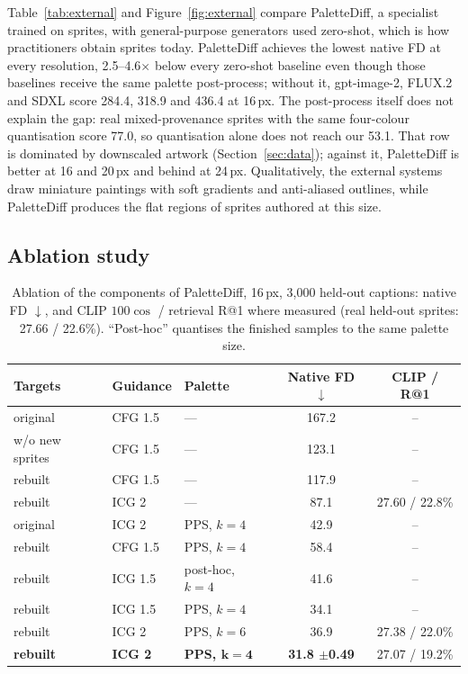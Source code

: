 \documentclass{article} %
\newcommand{\pmsd}[1]{{\scriptsize$\pm$#1}}
\newcommand{\ours}{PaletteDiff}
\begin{document}
Table~\ref{tab:external} and Figure~\ref{fig:external} compare \ours{}, a specialist trained on sprites, with
general-purpose generators used zero-shot, which is how practitioners obtain sprites today. \ours{} achieves the
lowest native FD at every resolution, 2.5--4.6$\times$ below every zero-shot baseline even
though those baselines receive the same palette post-process; without it, gpt-image-2, FLUX.2 and SDXL score 284.4, 318.9
and 436.4 at 16\,px. The post-process itself does not explain the gap: real mixed-provenance sprites with the same
four-colour quantisation score 77.0, so quantisation alone does not reach our 53.1. That row is dominated by
downscaled artwork (Section~\ref{sec:data}); against it, \ours{} is better at 16 and 20\,px and behind at 24\,px. Qualitatively, the external systems
draw miniature paintings with soft gradients and anti-aliased outlines, while \ours{} produces the flat regions of
sprites authored at this size.

\subsection{Ablation study}
\label{sec:ablation}

\begin{table}[t]
\caption{Ablation of the components of \ours{}, 16\,px, 3{,}000 held-out captions: native FD $\downarrow$, and CLIP
$100\cos$ / retrieval R@1 where measured (real held-out sprites: 27.66 / 22.6\%). ``Post-hoc'' quantises the finished
samples to the same palette size.}
\label{tab:main16}
\centering
\small
\begin{tabular}{@{}lllcc@{}}
\toprule
Targets & Guidance & Palette & Native FD $\downarrow$ & CLIP / R@1 \\
\midrule
original          & CFG 1.5   & ---                & 167.2 & -- \\
w/o new sprites   & CFG 1.5   & ---                & 123.1 & -- \\
rebuilt           & CFG 1.5   & ---                & 117.9 & -- \\
rebuilt           & ICG 2     & ---                & 87.1  & 27.60 / 22.8\% \\
\midrule
original          & ICG 2     & PPS, $k{=}4$       & 42.9  & -- \\
rebuilt           & CFG 1.5   & PPS, $k{=}4$       & 58.4  & -- \\
rebuilt           & ICG 1.5   & post-hoc, $k{=}4$  & 41.6  & -- \\
rebuilt           & ICG 1.5   & PPS, $k{=}4$       & 34.1  & -- \\
rebuilt           & ICG 2     & PPS, $k{=}6$       & 36.9  & 27.38 / 22.0\% \\
\textbf{rebuilt}  & \textbf{ICG 2} & \textbf{PPS, $\bm{k{=}4}$} & \textbf{31.8 \pmsd{0.49}} & 27.07 / 19.2\% \\
\bottomrule
\end{tabular}
\end{table}
\end{document}
